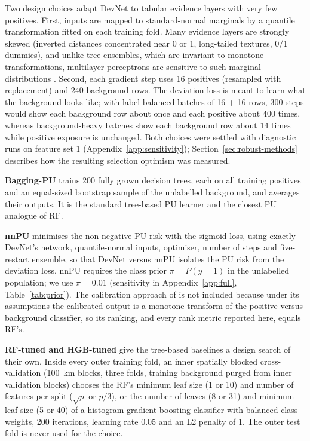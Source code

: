\documentclass[pdflatex,sn-apa]{sn-jnl}
\begin{document}
Two design choices adapt DevNet to tabular evidence layers with very few positives. First, inputs are mapped to standard-normal marginals by a quantile transformation fitted on each training fold. Many evidence layers are strongly skewed (inverted distances concentrated near 0 or 1, long-tailed textures, 0/1 dummies), and unlike tree ensembles, which are invariant to monotone transformations, multilayer perceptrons are sensitive to such marginal distributions \citep{Gorishniy2021,Grinsztajn2022}. Second, each gradient step uses 16 positives (resampled with replacement) and 240 background rows. The deviation loss is meant to learn what the background looks like; with label-balanced batches of 16 + 16 rows, 300 steps would show each background row about once and each positive about 400 times, whereas background-heavy batches show each background row about 14 times while positive exposure is unchanged. Both choices were settled with diagnostic runs on feature set 1 (Appendix~\ref{app:sensitivity}); Section~\ref{sec:robust-methods} describes how the resulting selection optimism was measured.

\textbf{Bagging-PU} \citep{Mordelet2014} trains 200 fully grown decision trees, each on all training positives and an equal-sized bootstrap sample of the unlabelled background, and averages their outputs. It is the standard tree-based PU learner and the closest PU analogue of RF.

\textbf{nnPU} \citep{Kiryo2017} minimises the non-negative PU risk with the sigmoid loss, using exactly DevNet's network, quantile-normal inputs, optimiser, number of steps and five-restart ensemble, so that DevNet versus nnPU isolates the PU risk from the deviation loss. nnPU requires the class prior $\pi = P(y=1)$ in the unlabelled population; we use $\pi = 0.01$ (sensitivity in Appendix~\ref{app:full}, Table~\ref{tab:prior}). The calibration approach of \citet{Elkan2008} is not included because under its assumptions the calibrated output is a monotone transform of the positive-versus-background classifier, so its ranking, and every rank metric reported here, equals RF's.

\textbf{RF-tuned and HGB-tuned} give the tree-based baselines a design search of their own. Inside every outer training fold, an inner spatially blocked cross-validation (100~km blocks, three folds, training background purged from inner validation blocks) chooses the RF's minimum leaf size (1 or 10) and number of features per split ($\sqrt{p}$ or $p/3$), or the number of leaves (8 or 31) and minimum leaf size (5 or 40) of a histogram gradient-boosting classifier \citep{Pedregosa2011} with balanced class weights, 200 iterations, learning rate 0.05 and an L2 penalty of 1. The outer test fold is never used for the choice.
\end{document}
